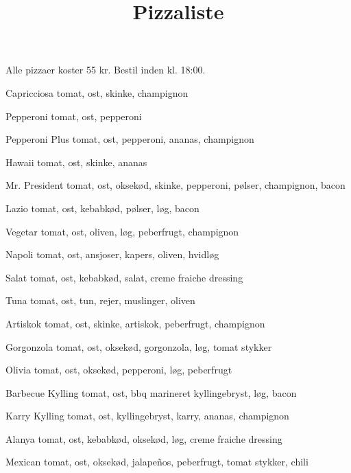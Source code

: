 

\title{Pizzaliste}
\date{}

\usepackage[marginparwidth = 10pt]{geometry}


\maketitle


Alle pizzaer koster 55 kr. Bestil inden kl. 18:00.

\begin{multicols}{2}
  \begin{enumdescription}
  \item[Capricciosa] tomat, ost, skinke, champignon
  \item[Pepperoni] tomat, ost, pepperoni
  \item[Pepperoni Plus] tomat, ost, pepperoni, ananas, champignon
  \item[Hawaii] tomat, ost, skinke, ananas
  \item[Mr. President] tomat, ost, oksekød, skinke, pepperoni, pølser,
    champignon, bacon
  \item[Lazio] tomat, ost, kebabkød, pølser, løg, bacon
  \item[Vegetar] tomat, ost, oliven, løg, peberfrugt, champignon
  \item[Napoli] tomat, ost, ansjoser, kapers, oliven, hvidløg
  \item[Salat] tomat, ost, kebabkød, salat, creme fraiche dressing
  \item[Tuna] tomat, ost, tun, rejer, muslinger, oliven
  \item[Artiskok] tomat, ost, skinke, artiskok, peberfrugt, champignon
  \item[Gorgonzola] tomat, ost, oksekød, gorgonzola, løg, tomat
    stykker
  \item[Olivia] tomat, ost, oksekød, pepperoni, løg, peberfrugt
  \item[Barbecue Kylling] tomat, ost, bbq marineret kyllingebryst,
    løg, bacon
  \item[Karry Kylling] tomat, ost, kyllingebryst, karry, ananas,
    champignon
  \item[Alanya] tomat, ost, kebabkød, oksekød, løg, creme fraiche
    dressing
  \item[Mexican] tomat, ost, oksekød, jalapeños, peberfrugt, tomat
    stykker, chili

\end{enumdescription}
\end{multicols}
